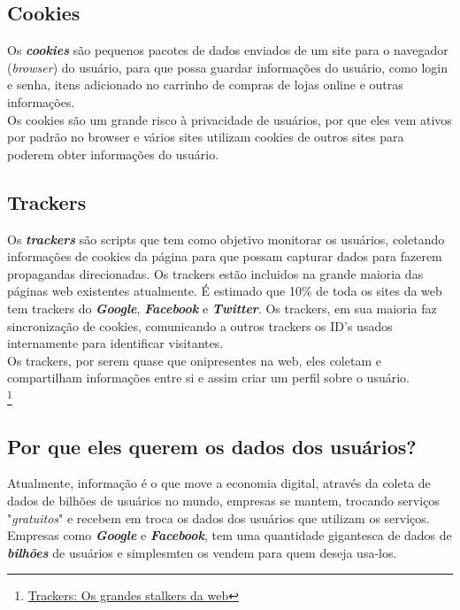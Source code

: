 \documentclass[12pt, letterpaper, DejaVuSansMono:12]{report}
\begin{document}
\subsection{Cookies}
	Os \textbf{\textit{cookies}} são pequenos pacotes de dados enviados de um site para o navegador (\textit{browser}) do usuário, para que possa guardar informações do usuário, como login e senha, itens adicionado no carrinho de compras de lojas online e outras informações.\\

	Os cookies são um grande risco à privacidade de usuários, por que eles vem ativos por padrão no browser e vários sites utilizam cookies de outros sites para poderem obter informações do usuário.\\

\subsection{Trackers}
	Os \textbf{\textit{trackers}} são scripts que tem como objetivo monitorar os usuários, coletando informações de cookies da página para que possam capturar dados para fazerem propagandas direcionadas. Os trackers estão incluidos na grande maioria das páginas web existentes atualmente. É estimado que 10\% de toda os sites da web tem trackers do \textbf{\textit{Google}}, \textbf{\textit{Facebook}} e \textbf{\textit{Twitter}}. Os trackers, em sua maioria faz sincronização de cookies, comunicando a outros trackers os ID's usados internamente para identificar visitantes.\\

	Os trackers, por serem quase que onipresentes na web, eles coletam e compartilham informações entre si e assim criar um perfil sobre o usuário.\\

\footnote{\href{https://antivigilancia.org/pt/2015/11/trackers-os-grandes-stalkers-da-web/}{Trackers: Os grandes stalkers da web}}

\subsection{Por que eles querem os dados dos usuários?}
	Atualmente, informação é o que move a economia digital, através da coleta de dados de bilhões de usuários no mundo, empresas se mantem, trocando serviços "\textit{gratuitos}" e recebem em troca os dados dos usuários que utilizam os serviços. Empresas como \textbf{\textit{Google}} e \textbf{\textit{Facebook}}, tem uma quantidade gigantesca de dados de \textbf{\textit{bilhões}} de usuários e simplesmten os vendem para quem deseja usa-los.\\
\end{document}
